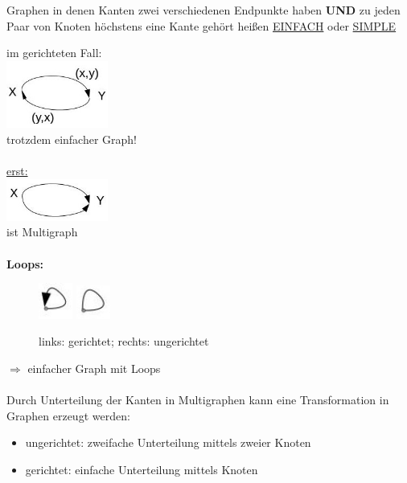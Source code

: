 Graphen in denen Kanten zwei verschiedenen Endpunkte haben \textbf{UND} zu jeden Paar von Knoten höchstens eine Kante gehört heißen \underline{EINFACH} oder \underline{SIMPLE}

im gerichteten Fall:\\
\includegraphics[width=0.25\textwidth]{lectures/161014/pix/1.jpg}
\\
trotzdem einfacher Graph!\\
\\
\underline{erst:}\\
\includegraphics[width=0.25\textwidth]{lectures/161014/pix/2.jpg}
\\
ist Multigraph
\\\\
\textbf{Loops:}
\begin{figure}[ht]
	\centering
  	\includegraphics[width=0.1\textwidth]{lectures/161014/pix/3.jpg}
  	\includegraphics[width=0.1\textwidth]{lectures/161014/pix/4.jpg}
	\caption{links: gerichtet; rechts: ungerichtet}
\end{figure}

$\Rightarrow$ einfacher Graph mit Loops
\\\\
Durch Unterteilung der Kanten in Multigraphen kann eine Transformation in Graphen erzeugt werden:
\begin{itemize}
	\item ungerichtet: zweifache Unterteilung mittels zweier Knoten
	\item gerichtet: einfache Unterteilung mittels Knoten
\end{itemize}

